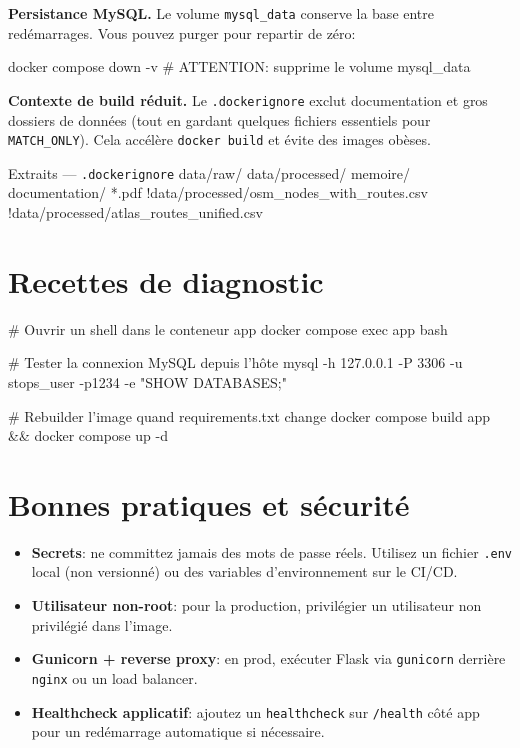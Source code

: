 \textbf{Persistance MySQL.} Le volume \texttt{mysql\_data} conserve la base entre redémarrages. Vous pouvez purger pour repartir de zéro:

\begin{cmdbox}
docker compose down -v  # ATTENTION: supprime le volume mysql_data
\end{cmdbox}

\textbf{Contexte de build réduit.} Le \texttt{.dockerignore} exclut documentation et gros dossiers de données (tout en gardant quelques fichiers essentiels pour \texttt{MATCH\_ONLY}). Cela accélère \texttt{docker build} et évite des images obèses.

\begin{codebox}[language=bash]{Extraits — \texttt{.dockerignore}}
data/raw/
data/processed/
memoire/
documentation/
*.pdf
!data/processed/osm_nodes_with_routes.csv
!data/processed/atlas_routes_unified.csv
\end{codebox}

\section{Recettes de diagnostic}

\begin{cmdbox}
# Ouvrir un shell dans le conteneur app
docker compose exec app bash

# Tester la connexion MySQL depuis l'hôte
mysql -h 127.0.0.1 -P 3306 -u stops_user -p1234 -e "SHOW DATABASES;"

# Rebuilder l'image quand requirements.txt change
docker compose build app && docker compose up -d
\end{cmdbox}

\section{Bonnes pratiques et sécurité}

\begin{itemize}
  \item \textbf{Secrets}: ne committez jamais des mots de passe réels. Utilisez un fichier \texttt{.env} local (non versionné) ou des variables d'environnement sur le CI/CD.
  \item \textbf{Utilisateur non-root}: pour la production, privilégier un utilisateur non privilégié dans l'image.
  \item \textbf{Gunicorn + reverse proxy}: en prod, exécuter Flask via \texttt{gunicorn} derrière \texttt{nginx} ou un load balancer.
  \item \textbf{Healthcheck applicatif}: ajoutez un \texttt{healthcheck} sur \texttt{/health} côté app pour un redémarrage automatique si nécessaire.
\end{itemize}

